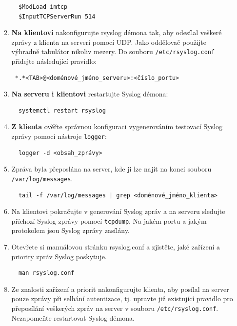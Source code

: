 \begin{itemize}
\begin{enumerate}
\begin{verbatim}
  $ModLoad imtcp
  $InputTCPServerRun 514
\end{verbatim} 

            \item {\bf Na klientovi} nakonfigurujte rsyslog démona tak, aby odesílal veškeré zprávy
         z klienta na serveri pomocí UDP. Jako oddělovač použijte výhradně tabulátor nikoliv mezery.
         Do souboru {\tt /etc/rsyslog.conf} přidejte následující pravidlo:
\begin{verbatim} 
 *.*<TAB>@<doménové_jméno_serveru>:<číslo_portu>
\end{verbatim}

            \item {\bf Na serveru i klientovi} restartujte Syslog démona: 
\begin{verbatim}
  systemctl restart rsyslog
\end{verbatim} 

            \item {\bf Z klienta} ověřte správnou konfiguraci vygenerováním testovací Syslog 
         zprávy pomocí nástroje {\tt logger}:
\begin{verbatim} 
  logger -d <obsah_zprávy>
\end{verbatim} 
        
            \item Zpráva byla přeposlána na server, kde ji lze najít na konci souboru
         {\tt /var/log/messages}.

\begin{verbatim} 
  tail -f /var/log/messages | grep <doménové_jméno_klienta>
\end{verbatim} 

            \item  Na klientovi pokračujte v generování Syslog zpráv a 
         na serveru sledujte příchozí Syslog zprávy pomocí {\tt tcpdump}. Na jakém
         portu a jakým protokolem jsou Syslog zprávy zasílány.
         
         

            \item Otevřete si manuálovou stránku rsyslog.conf a zjistěte, jaké zařízení a priority
         zpráv Syslog poskytuje. 
\begin{verbatim} 
  man rsyslog.conf
\end{verbatim} 
        
         \item Ze znalosti zařízení a priorit nakonfigurujte klienta, aby posílal na server 
         pouze zprávy při selhání autentizace, tj. upravte již existující pravidlo pro přeposílání
         veškerých zpráv na server v souboru {\tt /etc/rsyslog.conf}. Nezapomeňte restartovat Syslog démona. 
         

\end{enumerate}
\end{itemize}

